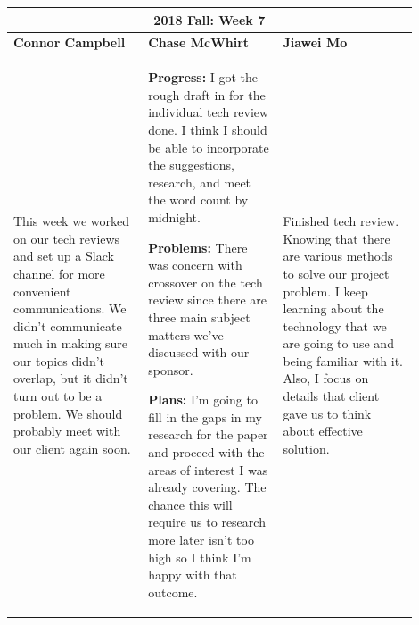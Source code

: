 \documentclass[10pt,journal,compsoc, draftclsnofoot,onecolumn]{IEEEtran}
\begin{document}
\begin{center}
\begin{tabular}{|p{0.3\linewidth}|p{0.3\linewidth}|p{0.3\linewidth}|}
\hline
\multicolumn{3}{|c|}{\textbf{2018 Fall: Week 7}} \\
\hline
\textbf{Connor Campbell} & \textbf{Chase McWhirt} & \textbf{Jiawei Mo} \\ [0.5ex]
\hline\hline

This week we worked on our tech reviews and set up a Slack channel for more convenient communications. We didn't communicate much in making sure our topics didn't overlap, but it didn't turn out to be a problem. We should probably meet with our client again soon.
&
\textbf{Progress:} I got the rough draft in for the individual tech review done.
I think I should be able to incorporate the suggestions, research, and meet the word count by midnight.

\textbf{Problems:} There was concern with crossover on the tech review since there are three main subject matters we've discussed with our sponsor.

\textbf{Plans:} I'm going to fill in the gaps in my research for the paper and proceed with the areas of interest I was already covering.
The chance this will require us to research more later isn't too high so I think I'm happy with that outcome.
&
Finished tech review. Knowing that there are various methods to solve our project problem. I keep learning about the technology that we are going to use and being familiar with it. Also, I focus on details that client gave us to think about effective solution.
\\ \hline
\end{tabular}
\end{center}
\end{document}
